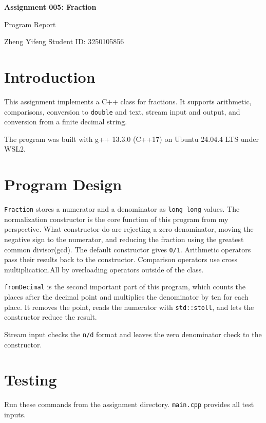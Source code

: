 \documentclass[10pt,a4paper]{article}
\newcommand{\code}[1]{\texttt{#1}}
\begin{document}
\begin{center}
    {\LARGE\bfseries Assignment 005: Fraction\par}
    \vspace{3pt}
    {\large Program Report\par}
    \vspace{3pt}
    Zheng Yifeng \enspace\textbar\enspace Student ID: 3250105856
\end{center}

\section{Introduction}

This assignment implements a C++ class for fractions. It supports arithmetic,
comparisons, conversion to \code{double} and text, stream input and output, and
conversion from a finite decimal string.

The program was built with g++ 13.3.0 (C++17) on Ubuntu 24.04.4 LTS under WSL2.

\section{Program Design}

\code{Fraction} stores a numerator and a denominator as \code{long long} values.
The normalization constructor is the core function of this program from my perspective.
What constructor do are rejecting a zero denominator, moving the negative sign to the numerator,
and reducing the fraction using the greatest common divisor(gcd). The default constructor gives
\code{0/1}. Arithmetic operators pass their results back to the constructor.
Comparison operators use cross multiplication.All by overloading operators outside of the class.

\code{fromDecimal} is the second important part of this program, which counts the places after
the decimal point and multiplies the denominator by ten for each place. It removes the point,
reads the numerator with \code{std::stoll}, and lets the constructor reduce the result.

Stream input checks the \code{n/d} format and leaves the zero denominator check to the constructor.

\section{Testing}

Run these commands from the assignment directory. \code{main.cpp} provides all
test inputs.
\end{document}
